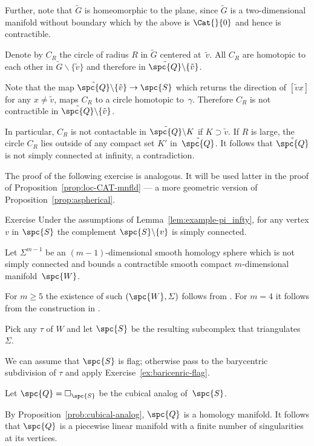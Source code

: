 Further, note that 
$\tilde G$ is homeomorphic to the plane, 
since $\tilde G$ is 
a two-dimensional manifold without boundary which 
by the above is $\Cat{}{0}$ and hence is contractible.

Denote by $C_R$ the circle of radius $R$ in $\tilde G$ centered at~$\tilde v$.
All $C_R$ are homotopic to each other in $\tilde G\backslash\{\tilde v\}$ and therefore in $\tilde{\spc{Q}}\backslash \{\tilde v\}$.

Note that the map $\tilde{\spc{Q}}\backslash \{\tilde v\}\to \spc{S}$
which returns the direction of $[{\tilde v}{x}]$  for any $x\ne \tilde v$, maps $C_R$ to a circle homotopic to~$\gamma$.
Therefore $C_R$ is not contractible in $\tilde{\spc{Q}}\backslash \{\tilde v\}$.

In particular, 
$C_R$ is not contactable in $\tilde{\spc{Q}}\backslash K$
if $K\supset \tilde v$.
If $R$ is large, 
the circle $C_R$  
lies outside of any compact set $K'$ in~$\tilde{\spc{Q}}$.
It follows that $\tilde{\spc{Q}}$ is not simply connected at infinity, a contradiction.
\qeds

The proof of the following exercise is analogous.
It will be used latter in the proof of Proposition~\ref{prop:loc-CAT-mnfld} --- a more geometric version of Proposition~\ref{prop:aspherical}.

\begin{thm}{Exercise}\label{ex:example-pi_infty-new}
Under the assumptions of Lemma~\ref{lem:example-pi_infty}, 
for any vertex $v$ in $\spc{S}$
the complement $\spc{S}\backslash\{v\}$ is simply connected.
\end{thm}

Let $\Sigma^{m-1}$ be an $(m-1)$-dimensional smooth homology sphere which is not simply connected and bounds a contractible smooth compact $m$-dimensional manifold~$\spc{W}$. 

For $m\ge 5$ the existence of such $(\spc{W}, \Sigma)$ follows from \cite{kervaire}. 
For $m=4$ it follows from the construction in \cite{mazur}.

Pick any  $\tau$ of $W$ and let $\spc{S}$ be the resulting subcomplex that triangulates~$\Sigma$.


We can assume that $\spc{S}$ is flag; 
otherwise pass to the barycentric subdivision 
of $\tau$ and apply Exercise~\ref{ex:baricenric-flag}.


Let $\spc{Q}=\square_{\spc{S}}$ be the cubical analog of~$\spc{S}$.

By Proposition~\ref{prob:cubical-analog},
$\spc{Q}$ is a homology manifold.
It follows that $\spc{Q}$ is a piecewise linear manifold 
with a finite number of singularities at its vertices.


